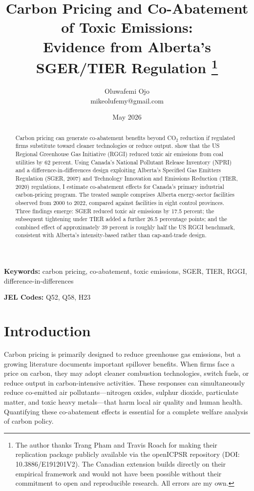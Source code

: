 \documentclass[12pt]{article}
\title{\textbf{Carbon Pricing and Co-Abatement of Toxic Emissions:\\
       Evidence from Alberta's SGER/TIER Regulation}%
       \thanks{The author thanks Trang Pham and Travis Roach for making 
their replication package publicly available via the 
openICPSR repository (DOI: 10.3886/E191201V2). The 
Canadian extension builds directly on their empirical 
framework and would not have been possible without their 
commitment to open and reproducible research. All errors are my own.}}
\author{Oluwafemi Ojo\\
        \small mikeolufemy@gmail.com}
\date{May 2026}
\begin{document}
\maketitle
\thispagestyle{empty}

\begin{abstract}
\noindent
Carbon pricing can generate co-abatement benefits beyond CO$_2$ reduction if
regulated firms substitute toward cleaner technologies or reduce output.
\citet{pham2024} show that the US Regional Greenhouse Gas Initiative (RGGI)
reduced toxic air emissions from coal utilities by 62 percent.
Using Canada's National Pollutant Release Inventory (NPRI) and a
difference-in-differences design exploiting Alberta's Specified Gas Emitters
Regulation (SGER, 2007) and Technology Innovation and Emissions Reduction
(TIER, 2020) regulations, I estimate co-abatement effects for Canada's
primary industrial carbon-pricing program.
The treated sample comprises Alberta energy-sector facilities observed from
2000 to 2022, compared against facilities in eight control provinces.
Three findings emerge: SGER reduced toxic air emissions by 17.5 percent;
the subsequent tightening under TIER added a further 26.5 percentage points;
and the combined effect of approximately 39 percent is roughly half the
US RGGI benchmark, consistent with Alberta's intensity-based rather than
cap-and-trade design.
\end{abstract}

\bigskip
\noindent\textbf{Keywords:} carbon pricing, co-abatement, toxic emissions,
SGER, TIER, RGGI, difference-in-differences

\noindent\textbf{JEL Codes:} Q52, Q58, H23

\newpage

\section{Introduction}

Carbon pricing is primarily designed to reduce greenhouse gas emissions, but
a growing literature documents important spillover benefits.
When firms face a price on carbon, they may adopt cleaner combustion
technologies, switch fuels, or reduce output in carbon-intensive activities.
These responses can simultaneously reduce co-emitted air pollutants---nitrogen
oxides, sulphur dioxide, particulate matter, and toxic heavy metals---that
harm local air quality and human health.
Quantifying these co-abatement effects is essential for a complete
welfare analysis of carbon policy.
\end{document}

